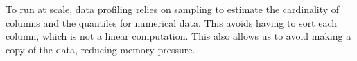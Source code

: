 %
%
%
%
%


To run at scale, data profiling relies on sampling to estimate the cardinality of
columns and the quantiles for numerical data. This avoids having to sort each
column, which is not a linear computation.  This also allows us to avoid making
a copy of the data,  reducing memory pressure.

